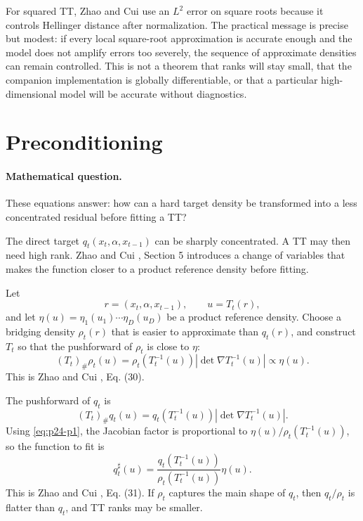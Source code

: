 \documentclass[11pt]{article}
\begin{document}
For squared TT, Zhao and Cui \cite{zhao2024ttsequential} use an \(L^2\) error on square roots because it
controls Hellinger distance after normalization.  The practical message is
precise but modest: if every local square-root approximation is accurate enough
and the model does not amplify errors too severely, the sequence of approximate
densities can remain controlled.  This is not a theorem that ranks will stay
small, that the companion implementation is globally differentiable, or that a
particular high-dimensional model will be accurate without diagnostics.

\section{Preconditioning}

\paragraph{Mathematical question.}
These equations answer: how can a hard target density be transformed into a
less concentrated residual before fitting a TT?

The direct target \(q_t(x_t,\alpha,x_{t-1})\) can be sharply concentrated.  A TT
may then need high rank.  Zhao and Cui \cite{zhao2024ttsequential}, Section 5 introduces a change of variables
that makes the function closer to a product reference density before fitting.

Let
\[
    r=(x_t,\alpha,x_{t-1}),\qquad u=T_t(r),
\]
and let \(\eta(u)=\eta_1(u_1)\cdots\eta_D(u_D)\) be a product reference density.
Choose a bridging density \(\rho_t(r)\) that is easier to approximate than
\(q_t(r)\), and construct \(T_t\) so that the pushforward of \(\rho_t\) is close
to \(\eta\):
\[
    (T_t)_\#\rho_t(u)
    =
    \rho_t(T_t^{-1}(u))
    \left|\det\nabla T_t^{-1}(u)\right|
    \propto
    \eta(u).
    \label{eq:p24-p1}
\]
This is Zhao and Cui \cite{zhao2024ttsequential}, Eq. (30).

The pushforward of \(q_t\) is
\[
    (T_t)_\#q_t(u)
    =
    q_t(T_t^{-1}(u))
    \left|\det\nabla T_t^{-1}(u)\right|.
\]
Using \eqref{eq:p24-p1}, the Jacobian factor is proportional to
\(\eta(u)/\rho_t(T_t^{-1}(u))\), so the function to fit is
\[
    q^\sharp_t(u)
    =
    \frac{q_t(T_t^{-1}(u))}
    {\rho_t(T_t^{-1}(u))}
    \eta(u).
    \label{eq:p24-p2}
\]
This is Zhao and Cui \cite{zhao2024ttsequential}, Eq. (31).  If \(\rho_t\) captures the main shape of \(q_t\),
then \(q_t/\rho_t\) is flatter than \(q_t\), and TT ranks may be smaller.
\end{document}
